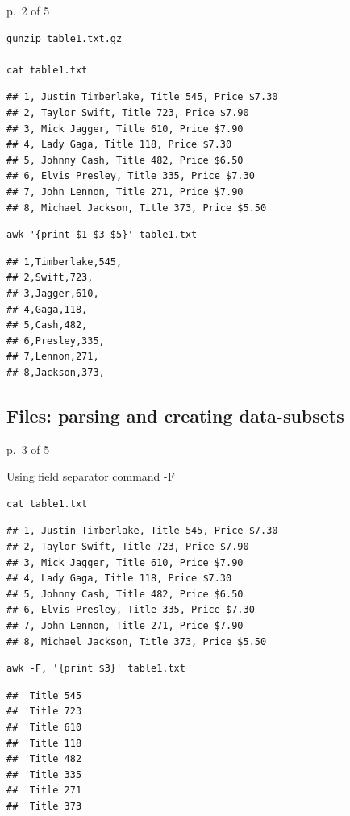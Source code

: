 \documentclass[
]{book}
\begin{document}
p.~2 of 5

\begin{verbatim}
gunzip table1.txt.gz

cat table1.txt
\end{verbatim}

\begin{verbatim}
## 1, Justin Timberlake, Title 545, Price $7.30
## 2, Taylor Swift, Title 723, Price $7.90
## 3, Mick Jagger, Title 610, Price $7.90
## 4, Lady Gaga, Title 118, Price $7.30
## 5, Johnny Cash, Title 482, Price $6.50
## 6, Elvis Presley, Title 335, Price $7.30
## 7, John Lennon, Title 271, Price $7.90
## 8, Michael Jackson, Title 373, Price $5.50
\end{verbatim}

\begin{verbatim}
awk '{print $1 $3 $5}' table1.txt
\end{verbatim}

\begin{verbatim}
## 1,Timberlake,545,
## 2,Swift,723,
## 3,Jagger,610,
## 4,Gaga,118,
## 5,Cash,482,
## 6,Presley,335,
## 7,Lennon,271,
## 8,Jackson,373,
\end{verbatim}

\hypertarget{files-parsing-and-creating-data-subsets-2}{%
\subsection{Files: parsing and creating data-subsets}\label{files-parsing-and-creating-data-subsets-2}}

p.~3 of 5

Using field separator command -F

\begin{verbatim}
cat table1.txt
\end{verbatim}

\begin{verbatim}
## 1, Justin Timberlake, Title 545, Price $7.30
## 2, Taylor Swift, Title 723, Price $7.90
## 3, Mick Jagger, Title 610, Price $7.90
## 4, Lady Gaga, Title 118, Price $7.30
## 5, Johnny Cash, Title 482, Price $6.50
## 6, Elvis Presley, Title 335, Price $7.30
## 7, John Lennon, Title 271, Price $7.90
## 8, Michael Jackson, Title 373, Price $5.50
\end{verbatim}

\begin{verbatim}
awk -F, '{print $3}' table1.txt
\end{verbatim}

\begin{verbatim}
##  Title 545
##  Title 723
##  Title 610
##  Title 118
##  Title 482
##  Title 335
##  Title 271
##  Title 373
\end{verbatim}
\end{document}
